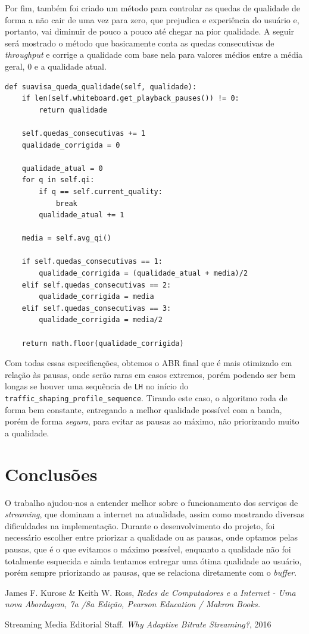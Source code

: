\documentclass[12pt]{article}
\begin{document}
Por fim, também foi criado um método para controlar as quedas de qualidade de forma a não cair de uma vez para zero, que prejudica e experiência do usuário e, portanto, vai diminuir de pouco a pouco até chegar na pior qualidade. A seguir será mostrado o método que basicamente conta as quedas consecutivas de \textit{throughput} e corrige a qualidade com base nela para valores médios entre a média geral, 0 e a qualidade atual.

\begin{lstlisting}
def suavisa_queda_qualidade(self, qualidade):
    if len(self.whiteboard.get_playback_pauses()) != 0:
        return qualidade

    self.quedas_consecutivas += 1
    qualidade_corrigida = 0

    qualidade_atual = 0
    for q in self.qi:
        if q == self.current_quality:
            break
        qualidade_atual += 1

    media = self.avg_qi()

    if self.quedas_consecutivas == 1:
        qualidade_corrigida = (qualidade_atual + media)/2
    elif self.quedas_consecutivas == 2:
        qualidade_corrigida = media
    elif self.quedas_consecutivas == 3:
        qualidade_corrigida = media/2

    return math.floor(qualidade_corrigida)
\end{lstlisting}

Com todas essas especificações, obtemos o ABR final que é mais otimizado em relação às pausas, onde serão raras em casos extremos, porém podendo ser bem longas se houver uma sequência de \texttt{LH} no início do \texttt{traffic\_shaping\_profile\_sequence}. Tirando este caso, o algoritmo roda de forma bem constante, entregando a melhor qualidade possível com a banda, porém de forma \textit{segura}, para evitar as pausas ao máximo, não priorizando muito a qualidade.

\section{Conclusões}
O trabalho ajudou-nos a entender melhor sobre o funcionamento dos serviços de \textit{streaming}, que dominam a internet na atualidade, assim como mostrando diversas dificuldades na implementação. Durante o desenvolvimento do projeto, foi necessário escolher entre priorizar a qualidade ou as pausas, onde optamos pelas pausas, que é o que evitamos o máximo possível, enquanto a qualidade não foi totalmente esquecida e ainda tentamos entregar uma ótima qualidade ao usuário, porém sempre priorizando as pausas, que se relaciona diretamente com o \textit{buffer}.

\begin{thebibliography}{9}

\noindent James F. Kurose \& Keith W. Ross, 
\textit{Redes de Computadores e a Internet - Uma nova Abordagem, 7a /8a Edição, Pearson Education / Makron Books.}

\noindent Streaming Media Editorial Staff.
\textit{Why Adaptive Bitrate Streaming?}, 2016

\end{thebibliography}
\end{document}
